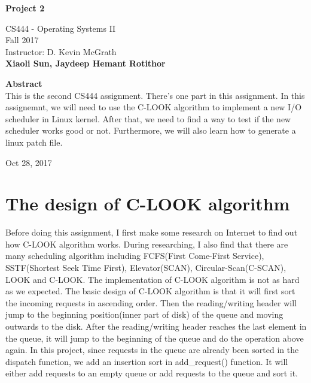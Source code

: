 \documentclass[10pt,letterpaper]{article}
\begin{document}
\begin{titlepage}
\begin{center}
    \Huge
    \textbf{Project 2}
    
    \vspace{0.5in}
    \large
    CS444 - Operating Systems II\\
    
    \vspace{0.2in}
    \large
    Fall 2017\\
    
    \vspace{0.2in}
    \large
    Instructor: D. Kevin McGrath\\
    
    \vspace{0.2in}
    \textbf{Xiaoli Sun, Jaydeep Hemant Rotithor}
    
    \vspace{0.5in}
    \textbf{Abstract}\\
    \vspace{0.2in}
    This is the second CS444 assignment. There's one part in this assignment. In this assignemnt, we will need to use the C-LOOK algorithm to implement a new I/O scheduler in Linux kernel. After that, we need to find a way to test if the new scheduler works good or not. Furthermore, we will also learn how to generate a linux patch file.
    
    \vspace{0.3in}
    \vfill
    
    Oct 28, 2017

\end{center}
\end{titlepage}




\newpage
\section{The design of C-LOOK algorithm}

\textbf{}

Before doing this assignment, I first make some research on Internet to find out how C-LOOK algorithm works. During researching, I also find that there are many scheduling algorithm including FCFS(First Come-First Service), SSTF(Shortest Seek Time First), Elevator(SCAN), Circular-Scan(C-SCAN), LOOK and C-LOOK. The implementation of C-LOOK algorithm is not as hard as we expected. The basic design of C-LOOK algorithm is that it will first sort the incoming requests in ascending order. Then the reading/writing header will jump to the beginning position(inner part of disk) of the queue and moving outwards to the disk. After the reading/writing header reaches the last element in the queue, it will jump to the beginning of the queue and do the operation above again. In this project, since requests in the queue are already been sorted in the dispatch function, we add an insertion sort in add\_request() function. It will either add requests to an empty queue or add requests to the queue and sort it. 
\end{document}
